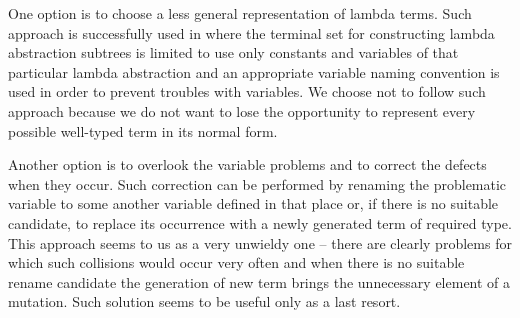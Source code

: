 \documentclass{sig-alternate}
\begin{document}

One option is to choose a less general representation of lambda terms.
Such approach is successfully used in \cite{yu01} where the 
terminal set for constructing lambda abstraction subtrees 
is limited to use only constants and variables of that particular
lambda abstraction and an appropriate variable naming convention is
used in order to prevent troubles with variables.
We choose not to follow such approach because we do not want to
lose the opportunity to represent every possible well-typed 
term in its normal form.

Another option is to overlook the variable problems and to correct the
defects when they occur. Such correction can be performed by 
renaming the problematic variable to some another variable defined in that place 
or, if there is no suitable candidate, to replace its occurrence with 
a newly generated term of required type. This approach seems to us as a very
unwieldy one -- there are clearly problems for which such collisions would
occur very often and when there is no suitable rename candidate the 
generation of new term brings the unnecessary element of a mutation.
Such solution seems to be useful only as a last resort.
\end{document}
